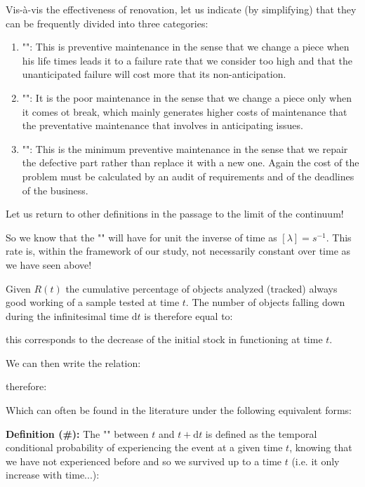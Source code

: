 	Vis-à-vis the effectiveness of renovation, let us indicate (by simplifying) that they can be frequently divided into three categories:
	
	\begin{enumerate}
		\item "": This is preventive maintenance in the sense that we change a piece when his life times leads it to a failure rate that we consider too high and that the unanticipated failure will cost more that its non-anticipation.
		
		\item "": It is the poor maintenance in the sense that we change a piece only when it comes ot break, which mainly generates higher costs of maintenance that the preventative maintenance that involves in anticipating issues.
		
		\item "": This is the minimum preventive maintenance in the sense that we repair the defective part rather than replace it with a new one. Again the cost of the problem must be calculated by an audit of requirements and of the deadlines of the business.
	\end{enumerate}
	
	Let us return to other definitions in the passage to the limit of the continuum!
	
	So we know that the "" will have for unit the inverse of time as $[\lambda]=s^{-1}$. This rate is, within the framework of our study, not necessarily constant over time as we have seen above!
	
	Given $R(t)$ the cumulative percentage of objects analyzed (tracked) always good working of a sample tested at time $t$. The number of objects falling down during the infinitesimal time $\mathrm{d}t$ is therefore equal to:
	
	this corresponds to the decrease of the initial stock in functioning at time $t$.
	
	We can then write the relation:
	
	therefore:
	
	Which can often be found in the literature under the following equivalent forms:
	

	\textbf{Definition (\#\mydef):} The "" between $t$ and $t + \mathrm{d}t$ is defined as the temporal conditional probability of experiencing the event at a given time $t$, knowing that we have not experienced before and so we survived up to a time $t$ (i.e. it only increase with time...):
	
